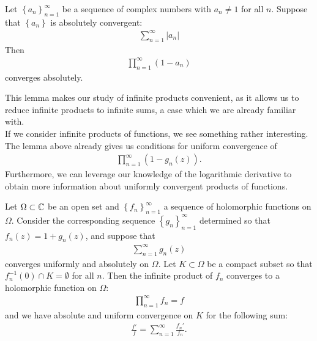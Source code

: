 \documentclass{memoir}
\begin{document}
\begin{lemma}
	Let \(\left\{ a_n \right\}_{n=1}^{\infty}\) be a sequence of complex numbers with \(a_n\neq 1\) for all \(n\). Suppose that \(\left\{ a_n \right\} \) is absolutely convergent:
	\begin{align*}
		\sum_{n=1}^{\infty} \left| a_n \right| 
	\end{align*}
	Then
	\begin{align*}
		\prod_{n=1}^{\infty} (1-a_n) 
	\end{align*}
	converges absolutely.
\end{lemma}
This lemma makes our study of infinite products convenient, as it allows us to reduce infinite products to infinite sums, a case which we are already familiar with.\\

If we consider infinite products of functions, we see something rather interesting.
The lemma above already gives us conditions for uniform convergence of
\begin{align*}
	\prod_{n=1}^{\infty} (1-g_n(z)) .
\end{align*}
Furthermore, we can leverage our knowledge of the logarithmic derivative to obtain more information about uniformly convergent products of functions.
\begin{lemma}
	Let \(\Omega \subset \mathbb{C}\) be an open set and \(\left\{ f_n \right\}_{n=1}^{\infty}\) a sequence of holomorphic functions on \(\Omega \).
	Consider the corresponding sequence \(\left\{ g_n \right\}_{n=1}^{\infty}\) determined so that \(f_n(z) = 1 + g_n(z)\), and suppose that
	\begin{align*}
		\sum_{n=1}^{\infty} g_n(z)
	\end{align*}
	converges uniformly and absolutely on \(\Omega \).
	Let \(K\subset \Omega \) be a compact subset so that \(f_n^{-1}(0)\cap K = \emptyset\) for all \(n\).
	Then the infinite product of \(f_n\) converges to a holomorphic function on \(\Omega \):
	\begin{align*}
		\prod_{n=1}^{\infty} f_n = f 
	\end{align*}
	and we have absolute and uniform convergence on \(K\) for the following sum:
	\begin{align*}
		\frac{f'}{f} = \sum_{n=1}^{\infty} \frac{f_n'}{f_n}.
	\end{align*}
\end{lemma}
\end{document}
